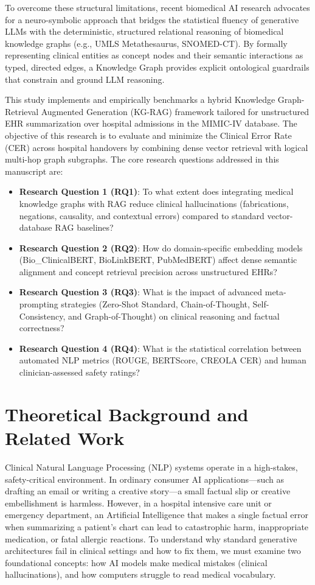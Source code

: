 \documentclass[11pt, a4paper]{article}
\begin{document}
To overcome these structural limitations, recent biomedical AI research advocates for a neuro-symbolic approach that bridges the statistical fluency of generative LLMs with the deterministic, structured relational reasoning of biomedical knowledge graphs (e.g., UMLS Metathesaurus, SNOMED-CT). By formally representing clinical entities as concept nodes and their semantic interactions as typed, directed edges, a Knowledge Graph provides explicit ontological guardrails that constrain and ground LLM reasoning.

This study implements and empirically benchmarks a hybrid Knowledge Graph-Retrieval Augmented Generation (KG-RAG) framework tailored for unstructured EHR summarization over hospital admissions in the MIMIC-IV database. The objective of this research is to evaluate and minimize the Clinical Error Rate (CER) across hospital handovers by combining dense vector retrieval with logical multi-hop graph subgraphs. The core research questions addressed in this manuscript are:
\begin{itemize}
  \item \textbf{Research Question 1 (RQ1)}: To what extent does integrating medical knowledge graphs with RAG reduce clinical hallucinations (fabrications, negations, causality, and contextual errors) compared to standard vector-database RAG baselines?
  \item \textbf{Research Question 2 (RQ2)}: How do domain-specific embedding models (Bio\_ClinicalBERT, BioLinkBERT, PubMedBERT) affect dense semantic alignment and concept retrieval precision across unstructured EHRs?
  \item \textbf{Research Question 3 (RQ3)}: What is the impact of advanced meta-prompting strategies (Zero-Shot Standard, Chain-of-Thought, Self-Consistency, and Graph-of-Thought) on clinical reasoning and factual correctness?
  \item \textbf{Research Question 4 (RQ4)}: What is the statistical correlation between automated NLP metrics (ROUGE, BERTScore, CREOLA CER) and human clinician-assessed safety ratings?
\end{itemize}

\section{Theoretical Background and Related Work}
Clinical Natural Language Processing (NLP) systems operate in a high-stakes, safety-critical environment. In ordinary consumer AI applications—such as drafting an email or writing a creative story—a small factual slip or creative embellishment is harmless. However, in a hospital intensive care unit or emergency department, an Artificial Intelligence that makes a single factual error when summarizing a patient's chart can lead to catastrophic harm, inappropriate medication, or fatal allergic reactions. To understand why standard generative architectures fail in clinical settings and how to fix them, we must examine two foundational concepts: how AI models make medical mistakes (clinical hallucinations), and how computers struggle to read medical vocabulary.
\end{document}
